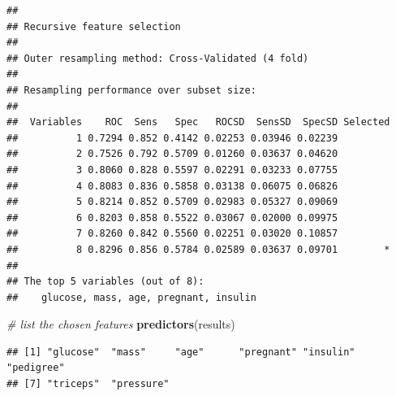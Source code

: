 \documentclass[]{book}
\newenvironment{Shaded}{\begin{snugshade}}{\end{snugshade}}
\newcommand{\KeywordTok}[1]{\textcolor[rgb]{0.13,0.29,0.53}{\textbf{#1}}}
\newcommand{\DataTypeTok}[1]{\textcolor[rgb]{0.13,0.29,0.53}{#1}}
\newcommand{\DecValTok}[1]{\textcolor[rgb]{0.00,0.00,0.81}{#1}}
\newcommand{\StringTok}[1]{\textcolor[rgb]{0.31,0.60,0.02}{#1}}
\newcommand{\CommentTok}[1]{\textcolor[rgb]{0.56,0.35,0.01}{\textit{#1}}}
\newcommand{\OperatorTok}[1]{\textcolor[rgb]{0.81,0.36,0.00}{\textbf{#1}}}
\newcommand{\NormalTok}[1]{#1}
\begin{document}
\begin{Shaded}
\end{Shaded}

\begin{verbatim}
## 
## Recursive feature selection
## 
## Outer resampling method: Cross-Validated (4 fold) 
## 
## Resampling performance over subset size:
## 
##  Variables    ROC  Sens   Spec   ROCSD  SensSD  SpecSD Selected
##          1 0.7294 0.852 0.4142 0.02253 0.03946 0.02239         
##          2 0.7526 0.792 0.5709 0.01260 0.03637 0.04620         
##          3 0.8060 0.828 0.5597 0.02291 0.03233 0.07755         
##          4 0.8083 0.836 0.5858 0.03138 0.06075 0.06826         
##          5 0.8214 0.852 0.5709 0.02983 0.05327 0.09069         
##          6 0.8203 0.858 0.5522 0.03067 0.02000 0.09975         
##          7 0.8260 0.842 0.5560 0.02251 0.03020 0.10857         
##          8 0.8296 0.856 0.5784 0.02589 0.03637 0.09701        *
## 
## The top 5 variables (out of 8):
##    glucose, mass, age, pregnant, insulin
\end{verbatim}

\begin{Shaded}
\begin{Highlighting}[]
\CommentTok{# list the chosen features}
\KeywordTok{predictors}\NormalTok{(results)}
\end{Highlighting}
\end{Shaded}

\begin{verbatim}
## [1] "glucose"  "mass"     "age"      "pregnant" "insulin"  "pedigree"
## [7] "triceps"  "pressure"
\end{verbatim}
\end{document}
